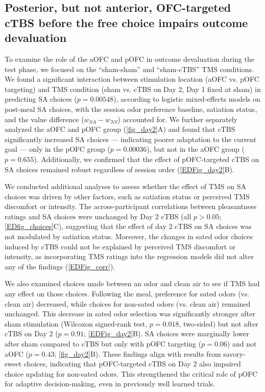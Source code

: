 \documentclass[lineno,sn-basic]{sn-jnl}%
\begin{document}
\subsection{Posterior, but not anterior, OFC-targeted cTBS before the free choice  impairs outcome devaluation}
\label{subsec-day2}

To examine the role of the aOFC and pOFC in outcome devaluation during the test phase, we focused on the ``sham-sham'' and ``sham-cTBS'' TMS conditions. We found a significant interaction between stimulation location (aOFC vs. pOFC targeting) and TMS condition (sham vs. cTBS on Day 2, Day 1 fixed at sham) in predicting SA choices ($p = 0.00548$), according to logistic mixed-effects models on post-meal SA choices, with the session odor preference baseline, satiation status, and the value difference ($w_{SA}-w_{NS}$) accounted for. We further separately analyzed the aOFC and pOFC group  (\autoref{fig_day2}A) and found that cTBS significantly increased SA choices --- indicating poorer adaptation to the current goal --- only in the pOFC group ($p = 0.00036$), but not in the aOFC group ($p = 0.655$). Additionally, we confirmed that the effect of pOFC-targeted cTBS on SA choices remained robust regardless of session order (\ref{EDFig_day2}B). 

We conducted additional analyses to assess whether the effect of TMS on SA choices was driven by other factors, such as satiation status or perceived TMS discomfort or intensity. The across-participant correlations between pleasantness ratings and SA choices were unchanged by Day 2 cTBS (all $p > 0.05$; \ref{EDfig_choices}C), suggesting that the effect of day 2 cTBS on SA choices was not modulated by satiation status. Moreover, the changes in sated odor choices induced by cTBS could not be explained by perceived TMS discomfort or intensity, as incorporating TMS ratings into the regression models did not alter any of the findings (\ref{EDFig_corr}).


We also examined choices made between an odor and clean air to see if TMS had any effect on those choices. Following the meal, preference for sated odors (vs. clean air) decreased, while choices for non-sated odors (vs. clean air) remained unchanged. This decrease in sated odor selection was significantly stronger after sham stimulation (Wilcoxon signed-rank test, $p = 0.018$, two-sided) but not after cTBS on Day 2 ($p = 0.91$; \ref{EDFig_day2}B). SA choices were marginally lower after sham compared to cTBS but only with pOFC targeting ($p = 0.06$) and not aOFC ($p = 0.43$; \autoref{fig_day2}B). These findings align with results from savory-sweet choices, indicating that pOFC-targeted cTBS on Day 2 also impaired choice updating for non-sated odors. This strengthened the critical role of pOFC for adaptive decision-making, even in previously well learned trials.
\end{document}
